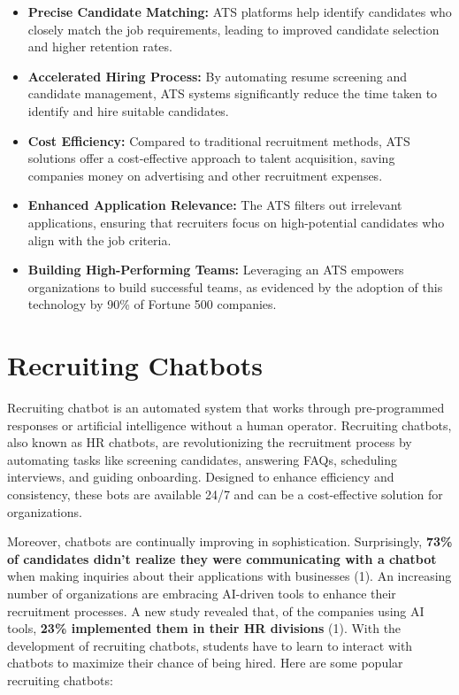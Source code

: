 \documentclass[
]{book}
\begin{document}
\begin{itemize}
\item
  \textbf{Precise Candidate Matching:} ATS platforms help identify candidates who closely match the job requirements, leading to improved candidate selection and higher retention rates.
\item
  \textbf{Accelerated Hiring Process:} By automating resume screening and candidate management, ATS systems significantly reduce the time taken to identify and hire suitable candidates.
\item
  \textbf{Cost Efficiency:} Compared to traditional recruitment methods, ATS solutions offer a cost-effective approach to talent acquisition, saving companies money on advertising and other recruitment expenses.
\item
  \textbf{Enhanced Application Relevance:} The ATS filters out irrelevant applications, ensuring that recruiters focus on high-potential candidates who align with the job criteria.
\item
  \textbf{Building High-Performing Teams:} Leveraging an ATS empowers organizations to build successful teams, as evidenced by the adoption of this technology by 90\% of Fortune 500 companies.
\end{itemize}

\hypertarget{recruiting-chatbots}{%
\chapter{Recruiting Chatbots}\label{recruiting-chatbots}}

Recruiting chatbot is an automated system that works through pre-programmed responses or artificial intelligence without a human operator. Recruiting chatbots, also known as HR chatbots, are revolutionizing the recruitment process by automating tasks like screening candidates, answering FAQs, scheduling interviews, and guiding onboarding. Designed to enhance efficiency and consistency, these bots are available 24/7 and can be a cost-effective solution for organizations.

Moreover, chatbots are continually improving in sophistication. Surprisingly, \textbf{73\% of candidates didn't realize they were communicating with a chatbot} when making inquiries about their applications with businesses (1). An increasing number of organizations are embracing AI-driven tools to enhance their recruitment processes. A new study revealed that, of the companies using AI tools, \textbf{23\% implemented them in their HR divisions} (1). With the development of recruiting chatbots, students have to learn to interact with chatbots to maximize their chance of being hired. Here are some popular recruiting chatbots:
\end{document}

